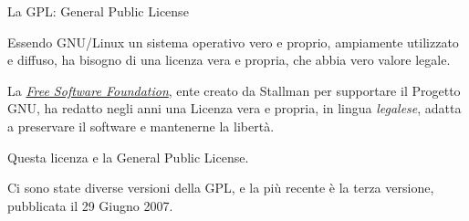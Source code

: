 \begin{slide}{La GPL: General Public License}
{\small 
Essendo GNU/Linux un sistema operativo vero e proprio, ampiamente
utilizzato e diffuso, ha bisogno di una licenza vera e propria, che
abbia vero valore legale. 

La \emph{\href{http://www.fsf.org/}{Free Software Foundation}}, ente
creato da Stallman per supportare il Progetto GNU, ha redatto negli anni
una Licenza vera e propria, in lingua \emph{legalese}, adatta a
preservare il software e mantenerne la libertà.

Questa licenza e la General Public License.

Ci sono state diverse versioni della GPL, e la più recente è la terza 
versione, pubblicata il 29 Giugno 2007.

}
\end{slide}

